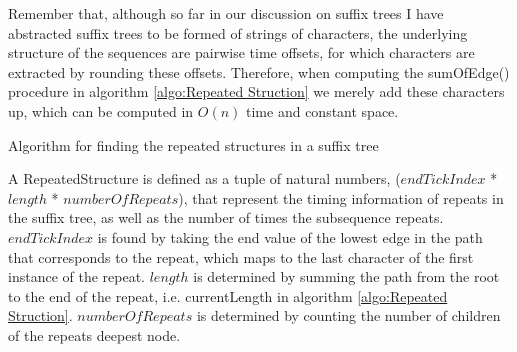 \documentclass[12pt,twoside,notitlepage]{report}
\begin{document}
			Remember that, although so far in our discussion on suffix trees I have abstracted suffix trees to be formed of strings of characters, the underlying structure of the sequences are pairwise time offsets, for which characters are extracted by rounding these offsets. Therefore, when computing the sumOfEdge() procedure in algorithm \ref{algo:Repeated Struction} we merely add these characters up, which can be computed in $O(n)$ time and constant space.
			
			\begin{algorithm}
			\caption{Algorithm for finding the repeated structures in a suffix tree}
			\label{algo:Repeated Struction}
			\begin{algorithmic}[1]
				
					
					\Else
						\Else
						\EndIf
					\EndIf
				\EndFor
			\EndProcedure
				\State {}
			\EndProcedure
			\end{algorithmic}
		\end{algorithm}
		
		A RepeatedStructure is defined as a tuple of natural numbers, ($endTickIndex$ * $length$ * $numberOfRepeats$), that represent the timing information of repeats in the suffix tree, as well as the number of times the subsequence repeats. $endTickIndex$ is found by taking the end value of the lowest edge in the path that corresponds to the repeat, which maps to the last character of the first instance of the repeat. $length$ is determined by summing the path from the root to the end of the repeat, i.e. currentLength in algorithm \ref{algo:Repeated Struction}. $numberOfRepeats$ is determined by counting the number of children of the repeats deepest node.
		
\end{document}
